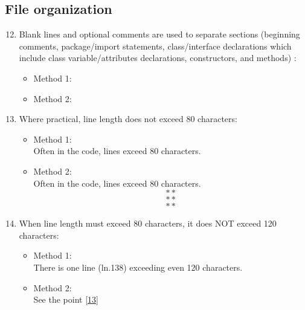 \subsection{File organization}
\begin{enumerate}
	\setcounter{enumi}{11}
	\item Blank lines and optional comments are used to separate sections (beginning comments, package/import statements, class/interface declarations which include class variable/attributes declarations, constructors, and methods) :
	\begin{itemize}
		\item Method 1: \cmark
		\item Method 2: \cmark
	\end{itemize}
	\item Where practical, line length does not exceed 80 characters:\label{13}
	\begin{itemize}
		\item Method 1: \xmark \\
		Often in the code, lines exceed 80 characters.
		\item Method 2: \xmark\\
		Often in the code, lines exceed 80 characters.
		$$**$$
		$$**$$
		$$**$$
	\end{itemize}
	\item When line length must exceed 80 characters, it does NOT exceed 120 characters:
	\begin{itemize}
		\item Method 1: \xmark \\
		There is one line (ln.138) exceeding even 120 characters.
		\item Method 2: \xmark\\
		See the point \ref{13}
	\end{itemize}
\end{enumerate}